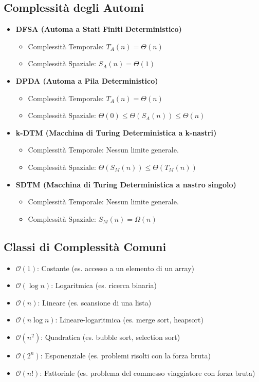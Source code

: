 \subsection*{Complessità degli Automi}
\begin{itemize}
    \item \textbf{DFSA (Automa a Stati Finiti Deterministico)}
    \begin{itemize}
        \item Complessità Temporale: $T_A(n) = \Theta(n)$
        \item Complessità Spaziale: $S_A(n) = \Theta(1)$
    \end{itemize}

    \item \textbf{DPDA (Automa a Pila Deterministico)}
    \begin{itemize}
        \item Complessità Temporale: $T_A(n) = \Theta(n)$
        \item Complessità Spaziale: $\Theta(0) \le \Theta(S_A(n)) \le \Theta(n)$
    \end{itemize}

    \item \textbf{k-DTM (Macchina di Turing Deterministica a k-nastri)}
    \begin{itemize}
        \item Complessità Temporale: Nessun limite generale.
        \item Complessità Spaziale: $\Theta(S_M(n)) \le \Theta(T_M(n))$
    \end{itemize}

    \item \textbf{SDTM (Macchina di Turing Deterministica a nastro singolo)}
    \begin{itemize}
        \item Complessità Temporale: Nessun limite generale.
        \item Complessità Spaziale: $S_M(n) = \Omega(n)$
    \end{itemize}
\end{itemize}

\subsection*{Classi di Complessità Comuni}
\begin{itemize}
    \item $\mathcal{O}(1)$: Costante (es. accesso a un elemento di un array)
    \item $\mathcal{O}(\log n)$: Logaritmica (es. ricerca binaria)
    \item $\mathcal{O}(n)$: Lineare (es. scansione di una lista)
    \item $\mathcal{O}(n \log n)$: Lineare-logaritmica (es. merge sort, heapsort)
    \item $\mathcal{O}(n^2)$: Quadratica (es. bubble sort, selection sort)
    \item $\mathcal{O}(2^n)$: Esponenziale (es. problemi risolti con la forza bruta)
    \item $\mathcal{O}(n!)$: Fattoriale (es. problema del commesso viaggiatore con forza bruta)
\end{itemize}